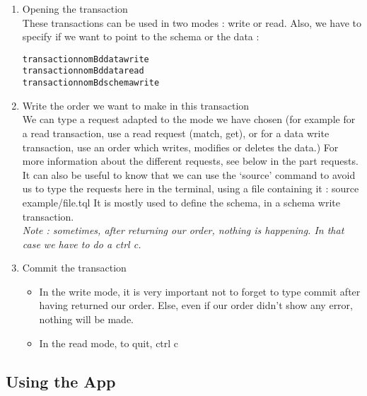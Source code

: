 \documentclass[runningheads]{llncs}
\begin{document}
\begin{enumerate}
\item Opening  the transaction\\
These transactions can be used in two modes : write or read. Also, we have to specify if we want to point to the schema or the data :

\begin{alltt}
transaction nomBd data write
transaction nomBd data read
transaction nomBd schema write
\end{alltt}       

\item Write the order we want to make in this transaction\\
We can type a request adapted to the mode we have chosen (for example for a read transaction, use a read request (match, get), or for a data write transaction, use an order which writes, modifies or deletes the data.) For more information about the different requests, see below in the part requests.\\

It can also be useful to know that we can use the ‘source’ command to avoid us to type the requests here in the terminal, using a file containing it : 
        source example/file.tql
It is mostly used to define the schema, in a schema write transaction.\\

\emph{Note : sometimes, after returning our order, nothing is happening. In that case we have to do a ctrl c.}\\

\item Commit the transaction
\begin{itemize}
\item In the write mode, it is very important not to forget to type commit after having returned our order. Else, even if our order didn’t show any error, nothing will be made.
\item In the read mode, to quit, ctrl c
\end{itemize}

\end{enumerate}


\subsection{Using the App}






































\end{document}

